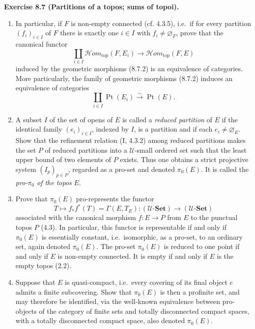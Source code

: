 \documentclass[11pt]{article}
\newcommand{\U}{\mathcal{U}}
\newcommand{\Set}{\mathbf{Set}}
\newcommand{\Ppoint}{\operatorname{Pt}}
\newcommand{\Hhomtop}{\mathcal{H}om_{\mathrm{top}}}
\newcommand{\ie}{i.e.}
\newenvironment{remarktext}[1]{\par\medskip\noindent\textbf{#1.}\ }{\par\medskip}
\begin{document}
\begin{remarktext}{Exercise 8.7 (Partitions of a topos; sums of topoi)}
\begin{enumerate}[label=\alph*)]
\item In particular, if \(F\) is non-empty connected (cf. 4.3.5), \ie\ if for every partition \((f_i)_{i\in I}\) of \(F\) there is exactly one \(i\in I\) with \(f_i\ne\varnothing_F\), prove that the canonical functor
\begin{equation*}
\coprod_{i\in I}\Hhomtop(F,E_i)\longrightarrow\Hhomtop(F,E)\tag{8.7.4}
\end{equation*}
induced by the geometric morphisms (8.7.2) is an equivalence of categories. More particularly, the family of geometric morphisms (8.7.2) induces an equivalence of categories
\[
\coprod_{i\in I}\Ppoint(E_i)\xrightarrow{\sim}\Ppoint(E).
\]

\item A subset \(I\) of the set of opens of \(E\) is called a \emph{reduced partition} of \(E\) if the identical family \((e_i)_{i\in I}\), indexed by \(I\), is a partition and if each \(e_i\ne\varnothing_E\). Show that the refinement relation (I, 4.3.2) among reduced partitions makes the set \(P\) of reduced partitions into a \(\U\)-small ordered set such that the least upper bound of two elements of \(P\) exists. Thus one obtains a strict projective system \((I_p)_{p\in P}\), regarded as a pro-set and denoted \(\pi_0(E)\). It is called the \emph{pro-\(\pi_0\) of the topos} \(E\).

\item Prove that \(\pi_0(E)\) pro-represents the functor
\[
T\longmapsto f_*f^*(T)=\Gamma(E,T_E):(\U\text{-}\Set)\longrightarrow(\U\text{-}\Set)
\]
associated with the canonical morphism \(f:E\to P\) from \(E\) to the punctual topos \(P\) (4.3). In particular, this functor is representable if and only if \(\pi_0(E)\) is essentially constant, \ie\ isomorphic, as a pro-set, to an ordinary set, again denoted \(\pi_0(E)\). The pro-set \(\pi_0(E)\) is reduced to one point if and only if \(E\) is non-empty connected. It is empty if and only if \(E\) is the empty topos (2.2).

\item Suppose that \(E\) is quasi-compact, \ie\ every covering of its final object \(e\) admits a finite subcovering. Show that \(\pi_0(E)\) is then a profinite set, and may therefore be identified, via the well-known equivalence between pro-objects of the category of finite sets and totally disconnected compact spaces, with a totally disconnected compact space, also denoted \(\pi_0(E)\).


\end{enumerate}
\end{remarktext}
\end{document}
